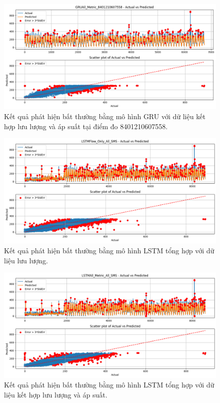 \begin{figure}[htbp]
    \centering
    \includegraphics[width=\textwidth]{image/section6_3/anomaly_detection_8401210607558_gru_allmetric.png}
    \caption{Kết quả phát hiện bất thường bằng mô hình GRU với dữ liệu kết hợp lưu lượng và áp suất tại điểm đo 8401210607558.}
    \label{fig:anomaly_gru_8401210607558_all}
\end{figure}

\begin{figure}[htbp]
    \centering
    \includegraphics[width=\textwidth]{image/section6_3/anomaly_detection_combined_lstm_flow.png}
    \caption{Kết quả phát hiện bất thường bằng mô hình LSTM tổng hợp với dữ liệu lưu lượng.}
    \label{fig:anomaly_combined_lstm_flow}
\end{figure}

\begin{figure}[htbp]
    \centering
    \includegraphics[width=\textwidth]{image/section6_3/anomaly_detection_combined_lstm_allmetric.png}
    \caption{Kết quả phát hiện bất thường bằng mô hình LSTM tổng hợp với dữ liệu kết hợp lưu lượng và áp suất.}
    \label{fig:anomaly_combined_lstm_all}
\end{figure}

